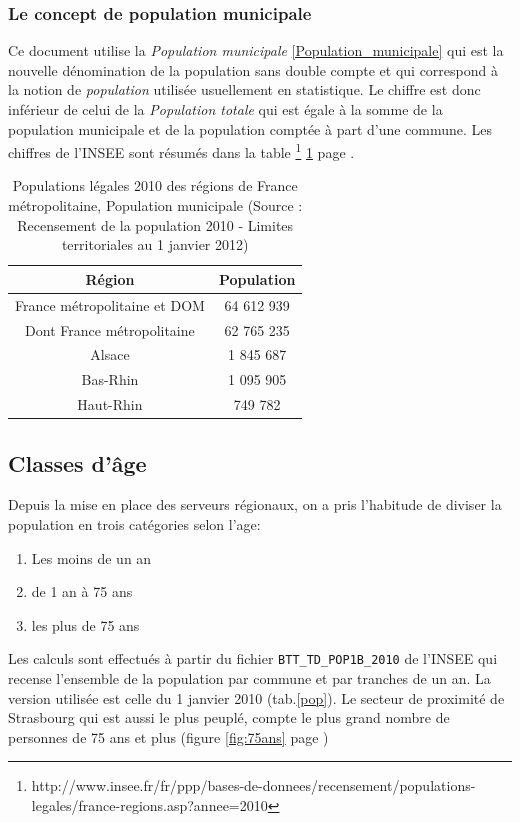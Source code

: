 \documentclass[12pt,english,french,twoside]{book}\usepackage[]{graphicx}\usepackage[]{color}
\providecommand{\tabularnewline}{\\} %
\begin{document}
\subsubsection{Le concept de population municipale}

Ce document utilise la \emph{Population municipale} \ref{Population_municipale}   qui est la nouvelle dénomination de la population sans double compte et qui correspond à la notion de \emph{population} utilisée usuellement en statistique.
Le chiffre est donc inférieur de celui de la \emph{Population totale} qui est égale à la somme de la population municipale et de la population comptée à part d'une commune.
Les chiffres de l'INSEE sont résumés dans la table \footnote{http://www.insee.fr/fr/ppp/bases-de-donnees/recensement/populations-legales/france-regions.asp?annee=2010} \ref{pop2010} page \pageref{pop2010}.

\begin{table}
\begin{center}
\begin{tabular}{|c|c|}
\hline 
Région & Population\tabularnewline
\hline 
\hline 
France métropolitaine et DOM & 64 612 939\tabularnewline
\hline 
Dont France métropolitaine & 62 765 235\tabularnewline
\hline 
Alsace & 1 845 687\tabularnewline
\hline 
Bas-Rhin & 1 095 905\tabularnewline
\hline 
Haut-Rhin & 749 782\tabularnewline
\hline 
\end{tabular}
\caption[Populations légales 2010]{Populations légales 2010 des régions de France métropolitaine, Population
municipale (Source : Recensement de la population 2010 - Limites territoriales
au 1\ier{} janvier 2012) }
\label{pop2010}
\end{center}
\end{table}

\subsection{Classes d'âge}
Depuis la mise en place des serveurs régionaux, on a pris l'habitude de diviser la population en trois catégories selon l'age:
\begin{enumerate}
  \item Les moins de un an
  \item de 1 an à 75 ans
  \item les plus de 75 ans
\end{enumerate}

Les calculs sont effectués à partir du fichier \texttt{BTT\_TD\_POP1B\_2010} de l'INSEE qui recense l'ensemble de la population par commune et par tranches de un an. La version utilisée est celle du 1\ier{} janvier 2010 (tab.\ref{pop}). Le secteur de proximité de Strasbourg qui est aussi le plus peuplé, compte le plus grand nombre de personnes de 75 ans et plus (figure \ref{fig:75ans} page \pageref{fig:75ans})
\end{document}
